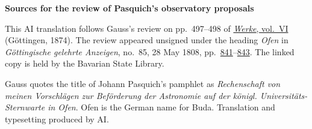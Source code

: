 \clearpage\thispagestyle{empty}
\begin{center}\textbf{Sources for the review of Pasquich’s observatory proposals}\end{center}
\noindent This AI translation follows Gauss’s review on pp.~497--498 of \href{https://gdz.sub.uni-goettingen.de/id/PPN236007467}{\textit{Werke}, vol.~VI} (Göttingen, 1874). The review appeared unsigned under the heading \emph{Ofen} in \textit{Göttingische gelehrte Anzeigen}, no.~85, 28 May 1808, pp.~\href{https://api.digitale-sammlungen.de/iiif/image/v2/bsb10538673_00847/full/1800,/0/default.jpg}{841}--\href{https://api.digitale-sammlungen.de/iiif/image/v2/bsb10538673_00849/full/1800,/0/default.jpg}{843}. The linked copy is held by the Bavarian State Library.
\par\smallskip\noindent Gauss quotes the title of Johann Pasquich’s pamphlet as \emph{Rechenschaft von meinen Vorschlägen zur Beförderung der Astronomie auf der königl. Universitäts-Sternwarte in Ofen}. Ofen is the German name for Buda. Translation and typesetting produced by AI.
\clearpage
